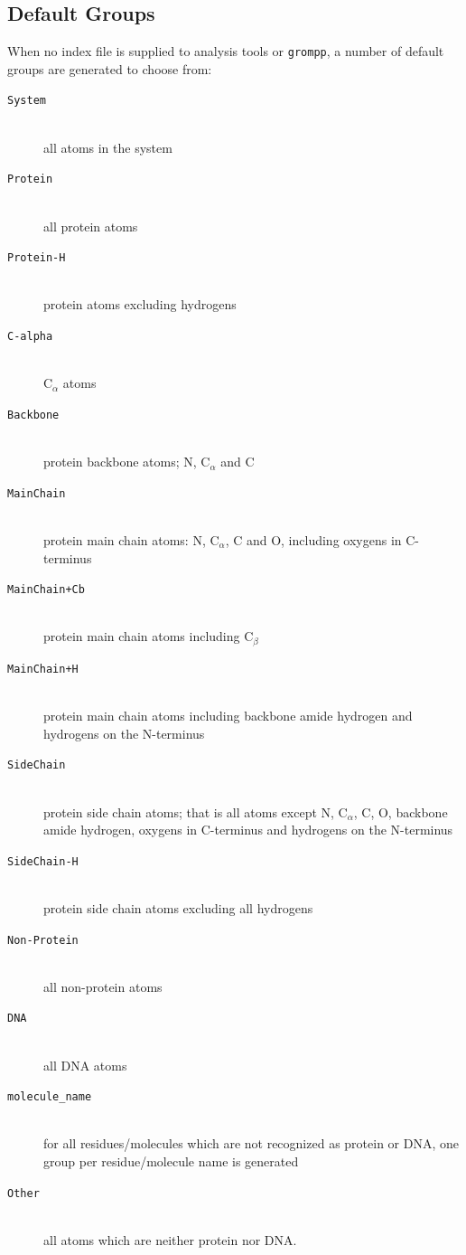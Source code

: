 \subsection{Default Groups}
\label{subsec:defaultgroups}
When no index file is supplied to analysis tools or {\tt grompp},
a number of default groups are generated to choose from:
\begin{description}
\item[{\tt System}]\mbox{}\\
        all atoms in the system
\item[{\tt Protein}]\mbox{}\\
        all protein atoms
\item[{\tt Protein-H}]\mbox{}\\
        protein atoms excluding hydrogens
\item[{\tt C-alpha}]\mbox{}\\
        C$_{\alpha}$ atoms
\item[{\tt Backbone}]\mbox{}\\
        protein backbone atoms; N, C$_{\alpha}$ and C
\item[{\tt MainChain}]\mbox{}\\
        protein main chain atoms: N, C$_{\alpha}$, C and O, including
        oxygens in C-terminus
\item[{\tt MainChain+Cb}]\mbox{}\\
        protein main chain atoms including C$_{\beta}$
\item[{\tt MainChain+H}]\mbox{}\\
        protein main chain atoms including backbone amide hydrogen and
        hydrogens on the N-terminus
\item[{\tt SideChain}]\mbox{}\\
        protein side chain atoms; that is all atoms except N,
        C$_{\alpha}$, C, O, backbone amide hydrogen, oxygens in
        C-terminus and hydrogens on the N-terminus
\item[{\tt SideChain-H}]\mbox{}\\
        protein side chain atoms excluding all hydrogens
\item[{\tt Non-Protein}]\mbox{}\\
        all non-protein atoms
\item[{\tt DNA}]\mbox{}\\
        all DNA atoms
\item[{\tt molecule\_name}]\mbox{}\\
        for all residues/molecules which are not recognized as protein
        or DNA, one group per residue/molecule name is generated
\item[{\tt Other}]\mbox{}\\
        all atoms which are neither protein nor DNA.
\end{description}
